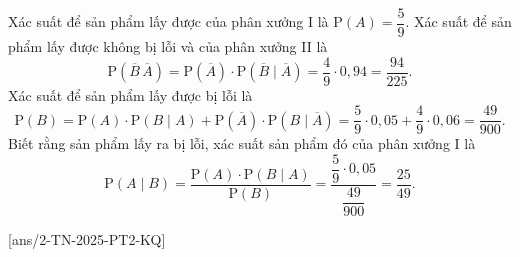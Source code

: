 \begin{ex}
{\begin{center}
		\end{center}
		\begin{itemchoice}
			\itemch Xác suất để sản phẩm lấy được của phân xưởng I là $\mathrm{P}(A)=\dfrac{5}{9}$.
			\itemch Xác suất để sản phẩm lấy được không bị lỗi và của phân xưởng II là $$\mathrm{P}\left(\overline{B}\,\overline{A}\right) = \mathrm{P}\left(\overline{A}\right) \cdot \mathrm{P}\left(\overline{B} \mid \overline{A}\right) = \dfrac{4}{9} \cdot 0{,}94 = \dfrac{94}{225}.$$
			\itemch Xác suất để sản phẩm lấy được bị lỗi là 
			$$\mathrm{P}(B) = \mathrm{P}(A) \cdot \mathrm{P}(B\mid A) + \mathrm{P}\left(\overline{A}\right) \cdot \mathrm{P}\left(B\mid \overline{A}\right) = \dfrac{5}{9}\cdot 0{,}05 + \dfrac{4}{9}\cdot 0{,}06 = \dfrac{49}{900}.$$
			\itemch Biết rằng sản phẩm lấy ra bị lỗi, xác suất sản phẩm đó của phân xưởng I là
			$$\mathrm{P}\left(A\mid B\right)= \dfrac{\mathrm{P}(A)\cdot \mathrm{P}(B\mid A)}{\mathrm{P}(B)} = \dfrac{\dfrac{5}{9}\cdot 0{,}05}{\dfrac{49}{900}} = \dfrac{25}{49}.$$
		\end{itemchoice}
	}
\end{ex}
\caukq
{}[ans/2-TN-2025-PT2-KQ]
